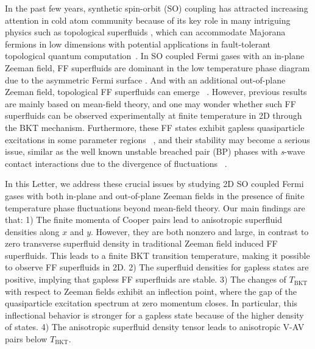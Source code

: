 \documentclass[prl,aps,twocolumn,showpacs, floatfix]{revtex4}
\begin{document}
In the past few years, synthetic spin-orbit (SO) coupling \cite%
{Lin2011Nature,Jing2012PRL,Zwierlen2012PRL,PanJian2012PRL,
Peter2013,Spilman2013PRL, Spilman2013NatRev} has attracted increasing
attention in cold atom community because of its key role in many intriguing
physics such as topological superfluids \cite%
{Zhang2008PRL,Sato2009PRL,ShiLiang2011PRL,LJiang2011PRL,
Lang2012PRL,Yi2013JPB,Xiong2014PRL}, which can accommodate Majorana fermions
in low dimensions with potential applications in fault-tolerant topological
quantum computation~\cite{Kitaev}. In SO coupled Fermi gases with an
in-plane Zeeman field, FF superfluids are dominant in the low temperature
phase diagram due to the asymmetric Fermi surface \cite{Zheng2013PRA,
FanWu2013PRL,Liu2013PRA,Fu2013PRA,LinDongArx,Hui2013PRA, Iskin2013,YongArx13}%
. And with an additional out-of-plane Zeeman field, topological FF
superfluids can emerge~\cite%
{Qu2013NC,Yi2013NC,XJ2013PRA,Chun2013PRL,Yong2014PRL,MGong2014PRB,YGao2014arXiv,Hu2014arXiv}%
. However, previous results are mainly based on mean-field theory, and one
may wonder whether such FF superfluids can be observed experimentally at
finite temperature in 2D through the BKT mechanism. Furthermore, these FF
states exhibit gapless quasiparticle excitations in some parameter regions~%
\cite%
{FanWu2013PRL,LinDongArx,Yong2014PRL,MGong2014PRB,YGao2014arXiv,Hu2014arXiv}%
, and their stability may become a serious issue, similar as the well known
unstable breached pair (BP) phases with \textit{s}-wave contact interactions
due to the divergence of fluctuations~ \cite%
{Vincent2003PRL,Yip2003PRA,Vincent2005PRL}.

In this Letter, we address these crucial issues by studying 2D SO coupled
Fermi gases with both in-plane and out-of-plane Zeeman fields in the
presence of finite temperature phase fluctuations beyond mean-field theory.
Our main findings are that: 1) The finite momenta of Cooper pairs lead to
anisotropic superfluid densities along $x$ and $y$. However,
they are both nonzero and large, in contrast to zero transverse superfluid
density in traditional Zeeman field induced FF superfluids. This leads to a
finite BKT transition temperature, making it possible to observe FF
superfluids in 2D. 2) The superfluid densities for gapless states are
positive, implying that gapless FF superfluids are stable. 3) The changes of
$T_{\mathrm{BKT}}$ with respect to Zeeman fields exhibit an inflection
point, where the gap of the quasiparticle excitation spectrum at zero
momentum closes. In particular, this inflectional behavior is stronger for a
gapless state because of the higher density of states. 4) The anisotropic
superfluid density tensor leads to anisotropic V-AV pairs below $T_{\mathrm{BKT}}$.
\end{document}
